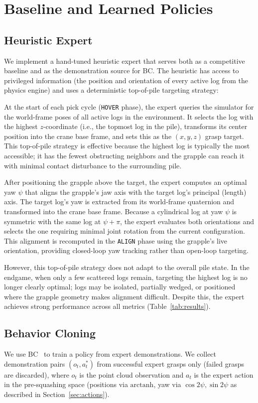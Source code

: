 \documentclass[conference]{IEEEtran}
\begin{document}
\section{Baseline and Learned Policies}

\subsection{Heuristic Expert}
\label{sec:expert}
We implement a hand-tuned heuristic expert that serves both as a competitive baseline and as the demonstration source for BC.
The heuristic has access to privileged information (the position and orientation of every active log from the physics engine) and uses a deterministic top-of-pile targeting strategy:

At the start of each pick cycle (\texttt{HOVER} phase), the expert queries the simulator for the world-frame poses of all active logs in the environment.
It selects the log with the highest $z$-coordinate (i.e., the topmost log in the pile), transforms its center position into the crane base frame, and sets this as the $(x,y,z)$ grasp target.
This top-of-pile strategy is effective because the highest log is typically the most accessible; it has the fewest obstructing neighbors and the grapple can reach it with minimal contact disturbance to the surrounding pile.

After positioning the grapple above the target, the expert computes an optimal yaw $\psi$ that aligns the grapple's jaw axis with the target log's principal (length) axis.
The target log's yaw is extracted from its world-frame quaternion and transformed into the crane base frame.
Because a cylindrical log at yaw $\psi$ is symmetric with the same log at $\psi + \pi$, the expert evaluates both orientations and selects the one requiring minimal joint rotation from the current configuration.
This alignment is recomputed in the \texttt{ALIGN} phase using the grapple's live orientation, providing closed-loop yaw tracking rather than open-loop targeting.

However, this top-of-pile strategy does not adapt to the overall pile state.
In the endgame, when only a few scattered logs remain, targeting the highest log is no longer clearly optimal; logs may be isolated, partially wedged, or positioned where the grapple geometry makes alignment difficult.
Despite this, the expert achieves strong performance across all metrics (Table~\ref{tab:results}).

\subsection{Behavior Cloning}
\label{sec:bc}
We use BC~\cite{pomerleau1988alvinn} to train a policy from expert demonstrations.
We collect demonstration pairs $(o_t, a_t^*)$ from successful expert grasps only (failed grasps are discarded), where $o_t$ is the point cloud observation and $a_t$ is the expert action in the pre-squashing space (positions via $\mathrm{arctanh}$, yaw via $\cos 2\psi, \sin 2\psi$ as described in Section~\ref{sec:actions}).
\end{document}
